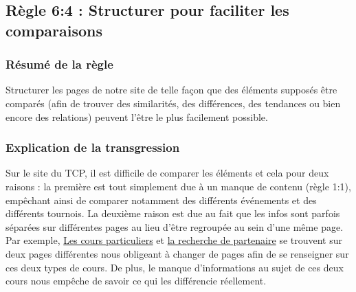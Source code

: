 \documentclass{article}[12pt]
\begin{document}
    \subsection{Règle 6:4 : Structurer pour faciliter les comparaisons}
    \label{comparaison}
     \subsubsection*{Résumé de la règle}
     Structurer les pages de notre site de telle façon que des éléments supposés être comparés (afin de trouver des similarités, des différences, des tendances ou bien encore des relations) peuvent l'être le plus facilement possible. 
    \subsubsection*{Explication de la transgression}
    Sur le site du TCP, il est difficile de comparer les éléments et cela pour deux raisons : la première est tout simplement due à un manque de contenu (règle 1:1), empêchant ainsi de comparer notamment des différents événements et des différents tournois. La deuxième raison est due au fait que les infos sont parfois séparées sur différentes pages au lieu d'être regroupée au sein d'une même page.
    \newline
    \newline
    Par exemple, \href{http://www.tennisclubdeparis.fr/lecons-particulieres.html}{Les cours particuliers} et \href{http://www.tennisclubdeparis.fr/page168.html}{la recherche de partenaire} se trouvent sur deux pages différentes nous obligeant à changer de pages afin de se renseigner sur ces deux types de cours. De plus, le manque d'informations au sujet de ces deux cours nous empêche de savoir ce qui les différencie réellement.
\end{document}
